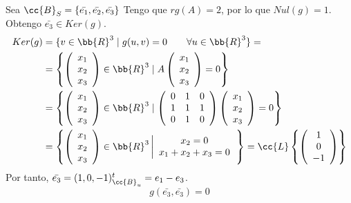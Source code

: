 \documentclass[12pt]{article}
\begin{document}
\begin{ejercicio}
\begin{enumerate}
        
        Sea $\cc{B}_S=\{\bar{e_1}, \bar{e_2}, \bar{e_3}\}$
        Tengo que $rg(A)=2$, por lo que $Nul(g)=1$. Obtengo $\bar{e_3}\in Ker(g)$.
        \begin{equation*}\begin{split}
            Ker(g) &= \{v \in \bb{R}^3 \mid g(u,v) = 0 \qquad \forall u\in \bb{R}^3\} 
            =\\
            &= \left\{ \left(\begin{array}{c}
                 x_1 \\ x_2 \\ x_3
            \end{array} \right) \in \bb{R}^3 \mid
            A
            \left(\begin{array}{c}
                 x_1 \\ x_2 \\ x_3
            \end{array} \right) = 0\right\} \\
            &= \left\{ \left(\begin{array}{c}
                 x_1 \\ x_2 \\ x_3
            \end{array} \right) \in \bb{R}^3 \mid \left(\begin{array}{ccc}
                0 & 1 & 0\\
                1 & 1 & 1 \\
                0 & 1 & 0
            \end{array} \right) 
            \left(\begin{array}{c}
                 x_1 \\ x_2 \\ x_3
            \end{array} \right) = 0\right\} \\
            &= \left\{ \left(\begin{array}{c}
                 x_1 \\ x_2 \\ x_3
            \end{array} \right) \in \bb{R}^3  \left|
            \begin{array}{c}
                x_2 = 0\\
                x_1 + x_2 + x_3 = 0 
            \end{array}\right.        
            \right\}
            = \cc{L} \left\{ \left(\begin{array}{c}
                 1 \\ 0 \\ -1 
            \end{array} \right) \right\}
        \end{split}\end{equation*}
        Por tanto, $\bar{e_3} = (1, 0, -1)^t_{\cc{B}_u} = e_1-e_3$.
        \begin{equation*}
            g(\bar{e_3}, \bar{e_3}) = 0
        \end{equation*}


\end{enumerate}
\end{ejercicio}
\end{document}

